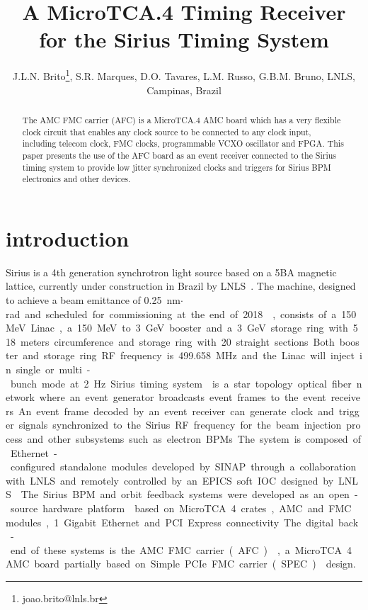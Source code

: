 \documentclass[a4paper,
               biblatex,      %
               ]{jacow}
\begin{document}
\title{A MicroTCA.4  Timing Receiver for the Sirius Timing System}

\author{J.L.N. Brito\thanks{joao.brito@lnls.br}, S.R. Marques, D.O. Tavares, L.M. Russo, G.B.M. Bruno, LNLS, Campinas, Brazil}
	
\maketitle


\begin{abstract}
   The AMC FMC carrier (AFC) is a MicroTCA.4 AMC board which has a very flexible clock circuit that enables any clock source to be connected to any clock input, including telecom clock, FMC clocks, programmable VCXO oscillator and FPGA. This paper presents the use of the AFC board as an event receiver connected to the Sirius timing system to provide low jitter synchronized clocks and triggers for Sirius BPM electronics and other devices.
\end{abstract}


\section{introduction}
Sirius is a 4th  generation  synchrotron light source  based  on  a 5BA magnetic lattice, currently under construction in Brazil by LNLS~\cite{sirius_ipac16}. The machine, designed to achieve a beam emittance of \SI{0.25}{nm$\cdot$rad} and scheduled for commissioning at the end of 2018~\cite{rodrigues2016sirius}, consists of a 150 MeV Linac, a 150 MeV to 3 GeV booster and a 3 GeV storage ring with 518 meters circumference and storage ring with 20 straight sections. Both booster and storage ring RF frequency is \SI{499.658}{MHz} and the Linac will inject in single or multi-bunch mode at \SI{2}{Hz}.

Sirius timing system~\cite{timing_icalepcs15} is a star topology optical fiber network where an event generator broadcasts event frames to the event receivers. An event frame decoded by an event receiver can generate clock and trigger signals synchronized to the Sirius RF frequency for the beam injection process and other subsystems such as electron BPMs. The system is composed of Ethernet-configured standalone modules developed by SINAP through a collaboration with LNLS and remotely controlled by an EPICS soft IOC designed by LNLS~\cite{sinap-timing-epics-ioc}.

The Sirius BPM and orbit feedback systems were developed as an open-source hardware platform~\cite{ebpm_icalepcs13} based on MicroTCA.4 crates, AMC and FMC modules, 1 Gigabit Ethernet and PCI Express connectivity. The digital back-end of these systems is the AMC FMC carrier (AFC)~\cite{afc-git}, a MicroTCA.4 AMC board partially based on Simple PCIe FMC carrier (SPEC)~\cite{spec} design. 
\end{document}
